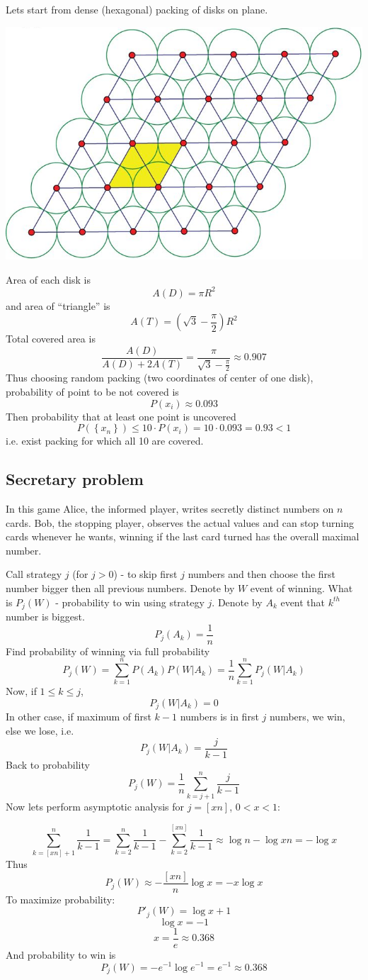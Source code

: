 Lets start from dense (hexagonal) packing of disks on plane.
\begin{center}
	\includegraphics[width=0.5\linewidth]{./lect26/1.png}
\end{center}
Area of each disk is 
$$A(D) = \pi R^2$$
and area of ``triangle'' is
$$A(T) = \left(\sqrt{3} - \frac{\pi}{2}\right)R^2$$
Total covered area is
$$\frac{A(D)}{A(D) + 2A(T)} = \frac{\pi}{\sqrt{3} - \frac{\pi}{2}} \approx 0.907$$
Thus choosing random packing (two coordinates of center of one disk), probability of point to be not covered is
$$P(x_i) \approx 0.093$$
Then probability that at least one point is uncovered
$$P\left(\left\{ x_n\right\}  \right) \leq 10 \cdot P(x_i) = 10 \cdot 0.093 = 0.93 < 1$$
i.e. exist packing for which all 10 are covered.

\subsection{Secretary problem}
 In this game Alice, the informed player, writes secretly distinct numbers on $n$ cards. Bob, the stopping player, observes the actual values and can stop turning cards whenever he wants, winning if the last card turned has the overall maximal number.
 
 
Call strategy $j$ (for $j>0$) - to skip first $j$ numbers and then choose the first number bigger then all previous numbers. Denote by $W$ event of winning. What is $P_j(W)$ - probability to win using strategy $j$.
Denote by $A_k$ event that $k^{th}$ number is biggest.
$$P_j(A_k) = \frac{1}{n}$$
Find probability of winning via full probability
$$P_j(W) = \sum_{k=1}^n P(A_k)P(W|A_k) = \frac{1}{n} \sum_{k=1}^n P_j(W|A_k)$$
Now, if $1\leq k \leq j$,
$$P_j(W|A_k) = 0 $$
In other case, if maximum of first $k-1$ numbers is in first $j$ numbers, we win, else we lose, i.e.
$$P_j(W|A_k)  = \frac{j}{k-1}$$
Back to probability
$$P_j(W) =  \frac{1}{n} \sum_{k=j+1}^n \frac{j}{k-1}$$
Now lets perform asymptotic analysis for $j = \left[xn\right]$, $0<x<1$:

$$ \sum_{k=[xn]+1}^n \frac{1}{k-1} = \sum_{k=2}^n \frac{1}{k-1} - \sum_{k=2}^{[xn]} \frac{1}{k-1} \approx \log n - \log xn = -\log x$$
Thus
$$P_j(W) \approx -\frac{[xn]}{n} \log x = -x \log x$$
To maximize probability:
$$P'_j(W) = \log x + 1$$
$$\log x = -1$$
$$x = \frac{1}{e} \approx 0.368$$
And probability to win is 
$$P_j(W)  = -e^{-1} \log e^{-1} = e^{-1}\approx 0.368$$